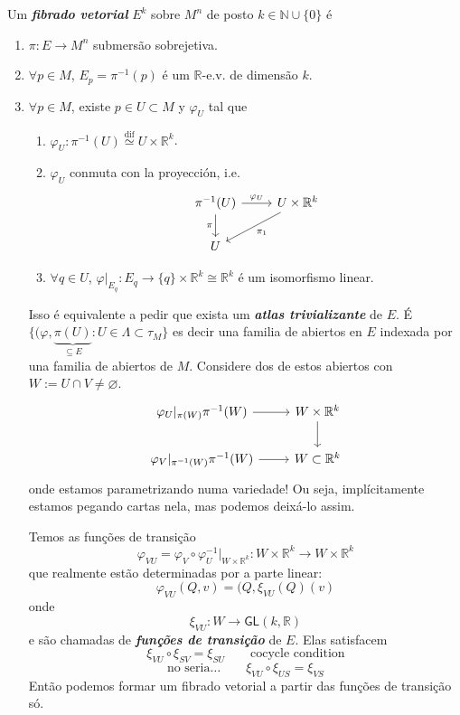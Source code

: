\begin{defn}\leavevmode
Um \textit{\textbf{fibrado vetorial }} \(E^k\) sobre \(M^n\) de posto \(k \in \mathbb{N} \cup  \{0\}\) é
\begin{enumerate}
\item \(\pi:E \to M^n\) submersão sobrejetiva.
\item \(\forall  p \in M\), \(E_p = \pi^{-1}(p)\) é um \(\mathbb{R}\)-e.v. de dimensão \(k\).
\item \(\forall p \in M\), existe \(p \in U \subset M\) y \(\varphi_U\) tal que
	\begin{enumerate}
\item  \(\varphi_U: \pi^{-1}(U) \overset{\operatorname{dif}}{\simeq}U \times \mathbb{R}^k\).
\item \(\varphi_U\) conmuta con la proyección, i.e.
	\[\begin{tikzcd}
	\pi^{-1}(U)\arrow[r,"\varphi_U"]\arrow[d,"\pi",swap]&U \times \mathbb{R}^k\arrow[dl,"\pi_1"]\\
	U
	\end{tikzcd}\]
	\item \(\forall  q \in U\), \(\varphi|_{E_q}:E_q \to \{q\} \times \mathbb{R}^k\cong\mathbb{R}^k\) é um isomorfismo linear.
		\end{enumerate}

	Isso é equivalente a pedir que exista um \textit{\textbf{atlas trivializante}} de \(E\). É \(\{(\varphi,\underbrace{\pi(U)}_{\subseteq E}:U \in \Lambda \subset \tau_M\}\) es decir una familia de abiertos en \(E\) indexada por una familia de abiertos de \(M\). Considere dos de estos abiertos con \(W:=U \cap V \neq  \varnothing\).
	\[\begin{tikzcd}
		\varphi_U|_{\pi(W)}\pi^{-1}(W)\arrow[r]& W \times \mathbb{R}^k\arrow[d]\\
		\varphi_V|_{\pi^{-1}(W)}\pi^{-1}(W)\arrow[r]&W \subset \mathbb{R}^k
	\end{tikzcd}\]
onde estamos parametrizando numa variedade! Ou seja, implícitamente estamos pegando cartas nela, mas podemos deixá-lo assim.

Temos as funções de transição
\[\varphi_{VU}=\varphi_V \circ \varphi_U^{-1}|_{W\times\mathbb{R}^k}:W\times\mathbb{R}^k \to W \times \mathbb{R}^k\]
que realmente estão determinadas por a parte linear:
\[\varphi_{VU}(Q,v)=(Q,\xi_{VU}(Q)(v)\]
onde
\[\xi_{VU}:W \to \mathsf{GL}(k,\mathbb{R})\]
e são chamadas de \textit{\textbf{funções de transição}} de \(E\). Elas satisfacem
\[\xi_{VU}\circ\xi_{SV}=\xi_{SU}\qquad \text{cocycle condition} \]
\[\text{no seria…} \qquad \xi_{VU}\circ\xi_{US}=\xi_{VS}\]
Então podemos formar um fibrado vetorial a partir das funções de transição só.
\end{enumerate}
\end{defn}

